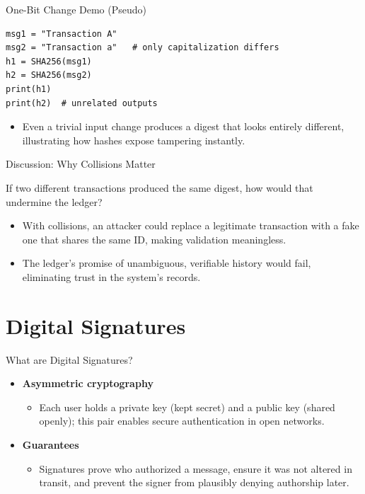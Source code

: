 \documentclass[aspectratio=169]{beamer}
\newcommand{\qbox}[1]{\begin{tcolorbox}#1\end{tcolorbox}}
\begin{document}
\begin{frame}[fragile]{One-Bit Change Demo (Pseudo)}
\begin{lstlisting}
msg1 = "Transaction A"
msg2 = "Transaction a"   # only capitalization differs
h1 = SHA256(msg1)
h2 = SHA256(msg2)
print(h1)
print(h2)  # unrelated outputs
\end{lstlisting}
  \begin{itemize}
    \item Even a trivial input change produces a digest that looks entirely different, illustrating how hashes expose tampering instantly.
  \end{itemize}
\end{frame}

\begin{frame}{Discussion: Why Collisions Matter}
  \qbox{If two different transactions produced the same digest, how would that undermine the ledger?}
  \begin{itemize}
    \item With collisions, an attacker could replace a legitimate transaction with a fake one that shares the same ID, making validation meaningless.
    \item The ledger’s promise of unambiguous, verifiable history would fail, eliminating trust in the system’s records.
  \end{itemize}
\end{frame}

\section{Digital Signatures}

\begin{frame}{What are Digital Signatures?}
  \begin{itemize}
    \item \textbf{Asymmetric cryptography}
      \begin{itemize}
        \item Each user holds a private key (kept secret) and a public key (shared openly); this pair enables secure authentication in open networks.
      \end{itemize}
    \item \textbf{Guarantees}
      \begin{itemize}
        \item Signatures prove who authorized a message, ensure it was not altered in transit, and prevent the signer from plausibly denying authorship later.
      \end{itemize}
  \end{itemize}
\end{frame}
\end{document}
